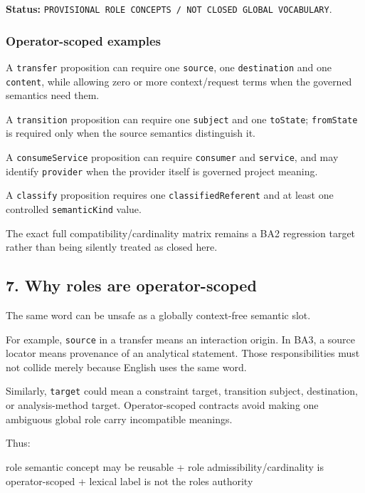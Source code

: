 \documentclass[
  10pt,
  letterpaper,
]{article}
\newenvironment{Shaded}{}{}
\newcommand{\NormalTok}[1]{#1}
\begin{document}
\textbf{Status:}
\texttt{PROVISIONAL\ ROLE\ CONCEPTS\ /\ NOT\ CLOSED\ GLOBAL\ VOCABULARY}.

\subsubsection{Operator-scoped examples}\label{operator-scoped-examples}

A \texttt{transfer} proposition can require one \texttt{source}, one
\texttt{destination} and one \texttt{content}, while allowing zero or
more context/request terms when the governed semantics need them.

A \texttt{transition} proposition can require one \texttt{subject} and
one \texttt{toState}; \texttt{fromState} is required only when the
source semantics distinguish it.

A \texttt{consumeService} proposition can require \texttt{consumer} and
\texttt{service}, and may identify \texttt{provider} when the provider
itself is governed project meaning.

A \texttt{classify} proposition requires one \texttt{classifiedReferent}
and at least one controlled \texttt{semanticKind} value.

The exact full compatibility/cardinality matrix remains a BA2 regression
target rather than being silently treated as closed here.

\subsection{7. Why roles are
operator-scoped}\label{why-roles-are-operator-scoped}

The same word can be unsafe as a globally context-free semantic slot.

For example, \texttt{source} in a transfer means an interaction origin.
In BA3, a source locator means provenance of an analytical statement.
Those responsibilities must not collide merely because English uses the
same word.

Similarly, \texttt{target} could mean a constraint target, transition
subject, destination, or analysis-method target. Operator-scoped
contracts avoid making one ambiguous global role carry incompatible
meanings.

Thus:

\begin{Shaded}
\begin{Highlighting}[]
\NormalTok{role semantic concept may be reusable}
\NormalTok{        +}
\NormalTok{role admissibility/cardinality is operator{-}scoped}
\NormalTok{        +}
\NormalTok{lexical label is not the role\textquotesingle{}s authority}
\end{Highlighting}
\end{Shaded}
\end{document}
